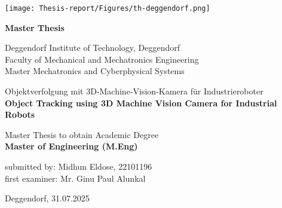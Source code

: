 \documentclass[12pt]{article}
\begin{document}
\begin{titlepage}
  \centering
  \vspace*{-2cm} %
  \texttt{[image: Thesis-report/Figures/th-deggendorf.png]}
  
  \vspace{1cm}
  
  \textbf{Master Thesis}\\[0.5em]
  {\normalfont\fontsize{14}{16}\selectfont}
  
  \vspace{0.7cm}
  
  Deggendorf Institute of Technology, Deggendorf\\[0.5em]
  Faculty of Mechanical and Mechatronics Engineering\\[0.5em]
  Master Mechatronics and Cyberphysical Systems
  
  \vspace{2cm}
  
  {\large Objektverfolgung mit 3D‑Machine‑Vision‑Kamera für Industrieroboter}\\[0.5em]
  \textbf{Object Tracking using 3D Machine Vision Camera for Industrial Robots}
  
  \vspace{1cm}
  
  Master Thesis to obtain Academic Degree\\[0.5em]
  \textbf{Master of Engineering (M.Eng)}
  
  \vspace{1cm}
  
  submitted by: Midhun Eldose, 22101196\\[0.5em]
  first examiner: Mr. Ginu Paul Alunkal
  
  \vspace{1cm}

  Deggendorf, 31.07.2025
\end{titlepage}
\end{document}

